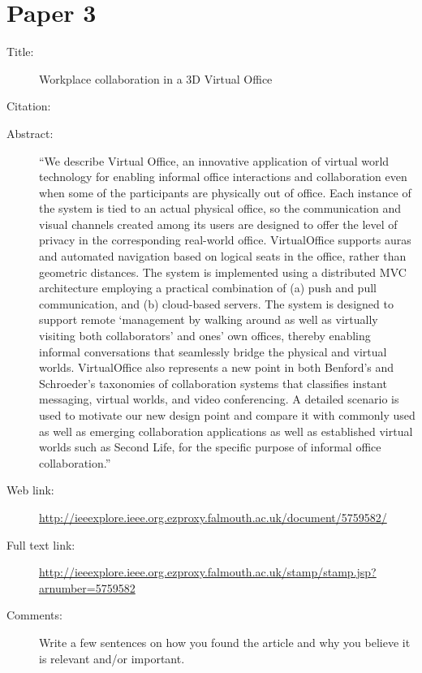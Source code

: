 \documentclass{scrartcl}
\begin{document}
\section*{Paper 3}
\begin{description}
\item[Title:] Workplace collaboration in a 3D Virtual Office
\item[Citation:] \cite{bibtex_key}
\item[Abstract:] ``We describe Virtual Office, an innovative application of virtual world technology for enabling informal office interactions and collaboration even when some of the participants are physically out of office. Each instance of the system is tied to an actual physical office, so the communication and visual channels created among its users are designed to offer the level of privacy in the corresponding real-world office. VirtualOffice supports auras and automated navigation based on logical seats in the office, rather than geometric distances. The system is implemented using a distributed MVC architecture employing a practical combination of (a) push and pull communication, and (b) cloud-based servers. The system is designed to support remote `management by walking around as well as virtually visiting both collaborators' and ones' own offices, thereby enabling informal conversations that seamlessly bridge the physical and virtual worlds. VirtualOffice also represents a new point in both Benford's and Schroeder's taxonomies of collaboration systems that classifies instant messaging, virtual worlds, and video conferencing. A detailed scenario is used to motivate our new design point and compare it with commonly used as well as emerging collaboration applications as well as established virtual worlds such as Second Life, for the specific purpose of informal office collaboration.''
\item[Web link:] \url{http://ieeexplore.ieee.org.ezproxy.falmouth.ac.uk/document/5759582/}
\item[Full text link:] \url{http://ieeexplore.ieee.org.ezproxy.falmouth.ac.uk/stamp/stamp.jsp?arnumber=5759582}
\item[Comments:] Write a few sentences on how you found the article and why you believe it is relevant and/or important.
\end{description}
\end{document}
